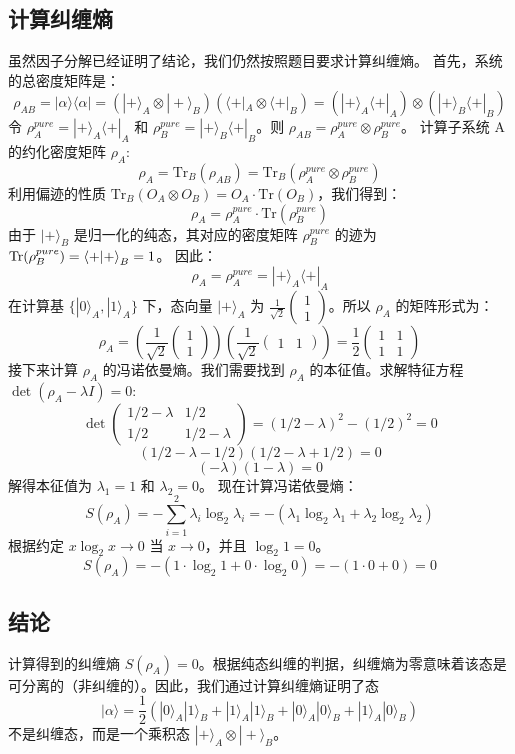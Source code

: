 \documentclass[12pt, a4paper]{article}
\newcommand{\otimesop}{\otimes}
\begin{document}
\subsection*{计算纠缠熵}
虽然因子分解已经证明了结论，我们仍然按照题目要求计算纠缠熵。
首先，系统的总密度矩阵是：
\[ \rho_{AB} = |\alpha\rangle\langle\alpha| = (|+\rangle_A \otimesop |+\rangle_B)(\langle+|_A \otimesop \langle+|_B) = (|+\rangle_A\langle+|_A) \otimesop (|+\rangle_B\langle+|_B) \]
令 \(\rho_A^{pure} = |+\rangle_A\langle+|_A\) 和 \(\rho_B^{pure} = |+\rangle_B\langle+|_B\)。则 \(\rho_{AB} = \rho_A^{pure} \otimesop \rho_B^{pure}\)。
计算子系统 A 的约化密度矩阵 \(\rho_A\):
\[ \rho_A = \text{Tr}_B(\rho_{AB}) = \text{Tr}_B(\rho_A^{pure} \otimesop \rho_B^{pure}) \]
利用偏迹的性质 \(\text{Tr}_B(O_A \otimesop O_B) = O_A \cdot \text{Tr}(O_B)\)，我们得到：
\[ \rho_A = \rho_A^{pure} \cdot \text{Tr}(\rho_B^{pure}) \]
由于 \(|+\rangle_B\) 是归一化的纯态，其对应的密度矩阵 \(\rho_B^{pure}\) 的迹为 \(\text{Tr}(\rho_B^{pure}) = \braket{+|+}_B = 1\)。
因此：
\[ \rho_A = \rho_A^{pure} = |+\rangle_A\langle+|_A \]
在计算基 \(\{|0\rangle_A, |1\rangle_A\}\) 下，态向量 \(|+\rangle_A\) 为 \(\frac{1}{\sqrt{2}}\begin{pmatrix} 1 \\ 1 \end{pmatrix}\)。所以 \(\rho_A\) 的矩阵形式为：
\[ \rho_A = \left( \frac{1}{\sqrt{2}}\begin{pmatrix} 1 \\ 1 \end{pmatrix} \right) \left( \frac{1}{\sqrt{2}}\begin{pmatrix} 1 & 1 \end{pmatrix} \right) = \frac{1}{2} \begin{pmatrix} 1 & 1 \\ 1 & 1 \end{pmatrix} \]
接下来计算 \(\rho_A\) 的冯诺依曼熵。我们需要找到 \(\rho_A\) 的本征值。求解特征方程 \(\det(\rho_A - \lambda I) = 0\):
\[ \det \begin{pmatrix} 1/2 - \lambda & 1/2 \\ 1/2 & 1/2 - \lambda \end{pmatrix} = (1/2 - \lambda)^2 - (1/2)^2 = 0 \]
\[ (1/2 - \lambda - 1/2)(1/2 - \lambda + 1/2) = 0 \]
\[ (-\lambda)(1 - \lambda) = 0 \]
解得本征值为 \(\lambda_1 = 1\) 和 \(\lambda_2 = 0\)。
现在计算冯诺依曼熵：
\[ S(\rho_A) = -\sum_{i=1}^2 \lambda_i \log_2 \lambda_i = -(\lambda_1 \log_2 \lambda_1 + \lambda_2 \log_2 \lambda_2) \]
根据约定 \(x \log_2 x \to 0\) 当 \(x \to 0\)，并且 \(\log_2 1 = 0\)。
\[ S(\rho_A) = -(1 \cdot \log_2 1 + 0 \cdot \log_2 0) = -(1 \cdot 0 + 0) = 0 \]
\subsection*{结论}
计算得到的纠缠熵 \(S(\rho_A) = 0\)。根据纯态纠缠的判据，纠缠熵为零意味着该态是可分离的（非纠缠的）。因此，我们通过计算纠缠熵证明了态
\[ |\alpha\rangle = \frac{1}{2} (|0\rangle_A|1\rangle_B + |1\rangle_A|1\rangle_B + |0\rangle_A|0\rangle_B + |1\rangle_A|0\rangle_B) \]
不是纠缠态，而是一个乘积态 \(|+\rangle_A \otimesop |+\rangle_B\)。
\end{document}
